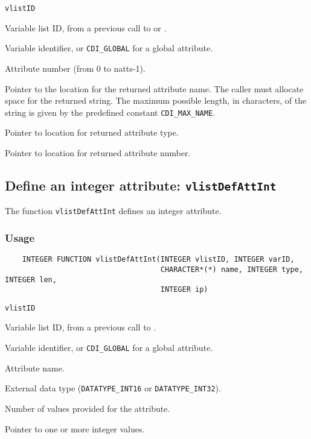 \hspace*{4mm}\begin{minipage}[]{15cm}
\begin{deflist}{\tt vlistID\ }
\item[{\tt vlistID}]
Variable list ID, from a previous call to {} or {}.
\item[{\tt varID}]
Variable identifier, or {\tt CDI\_GLOBAL} for a global attribute.
\item[{\tt attnum}]
Attribute number (from 0 to natts-1).
\item[{\tt name}]
Pointer to the location for the returned attribute name. The caller must allocate space for the
                    returned string. The maximum possible length, in characters, of
                    the string is given by the predefined constant {\tt CDI\_MAX\_NAME}.
\item[{\tt typep}]
Pointer to location for returned attribute type.
\item[{\tt lenp}]
Pointer to location for returned attribute number.

\end{deflist}
\end{minipage}


\subsection{Define an integer attribute: {\tt vlistDefAttInt}}
\label{vlistDefAttInt}

The function {\tt vlistDefAttInt} defines an integer attribute.

\subsubsection*{Usage}

\begin{verbatim}
    INTEGER FUNCTION vlistDefAttInt(INTEGER vlistID, INTEGER varID, 
                                    CHARACTER*(*) name, INTEGER type, INTEGER len, 
                                    INTEGER ip)
\end{verbatim}

\hspace*{4mm}\begin{minipage}[]{15cm}
\begin{deflist}{\tt vlistID\ }
\item[{\tt vlistID}]
Variable list ID, from a previous call to {}.
\item[{\tt varID}]
Variable identifier, or {\tt CDI\_GLOBAL} for a global attribute.
\item[{\tt name}]
Attribute name.
\item[{\tt type}]
External data type ({\tt DATATYPE\_INT16} or {\tt DATATYPE\_INT32}).
\item[{\tt len}]
Number of values provided for the attribute.
\item[{\tt ip}]
Pointer to one or more integer values.

\end{deflist}
\end{minipage}


